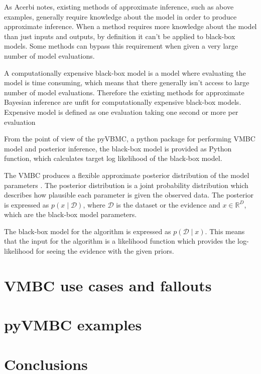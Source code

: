 \documentclass[english,oneside,openany]{UH_DS_report}
\begin{document}
As Acerbi \cite{acerbi2018} notes, existing methods of approximate inference, 
such as above examples, generally require knowledge about the 
model in order to produce approximate inference. When a method requires more knowledge about the model
than just inputs and outputs, by definition it can't be applied to black-box models. Some methods
can bypass this requirement when given a very large number of model evaluations.

A computationally expensive black-box model is a model where evaluating the model is time consuming, 
which means that there generally isn't access to large number of model evaluations. Therefore the existing methods for approximate Bayesian inference are unfit for 
computationally expensive black-box models. Expensive model is defined as one evaluation taking 
one second or more per evaluation\cite{pyvmbc}

From the point of view of the pyVBMC, a python package for performing VMBC model 
and posterior inference, the black-box model is provided as Python function, 
which calculates target log likelihood of the black-box model.

The VMBC produces a flexible approximate posterior distribution of the model parameters 
\cite{acerbi2018}. The posterior distribution is a joint probability distribution which describes 
how plausible each parameter is given the observed data. The posterior is expressed as $p(x \mid \mathcal{D})$,
where $\mathcal{D}$ is the dataset or the evidence and $x \in \mathbb{R}^D$, 
which are the black-box model parameters.

The black-box model for the algorithm is expressed as $p(\mathcal{D} \mid x)$. This means that the 
input for the algorithm is a likelihood function which provides the log-likelihood for seeing the 
evidence with the given priors.


\chapter{VMBC use cases and fallouts}
\label{chapter:layout}

\chapter{pyVMBC examples}
\label{chapter:layout}

\chapter{Conclusions}
\label{chapter:conclusions}


% 
\cleardoublepage %

\renewcommand\bibname{References}
\addcontentsline{toc}{chapter}{\bibname} %

\end{document}
